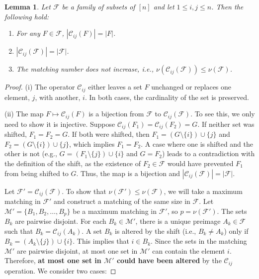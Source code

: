 \documentclass[runningheads,12pt,a4paper]{article}
\newtheorem{lemma}{Lemma}
\begin{document}
\begin{lemma}
	Let $\mathcal{F}$ be a family of subsets of $[n]$ and let $1 \leq i, j \leq n$. Then the following hold:
	\begin{enumerate}[label=(\roman*)]
		\item For any $F \in \mathcal{F}$, $|\mathcal{C}_{ij}(F)| = |F|$.
		\item $|\mathcal{C}_{ij}(\mathcal{F})| = |\mathcal{F}|$.
		\item The matching number does not increase, i.e., $\nu(\mathcal{C}_{ij}(\mathcal{F})) \leq \nu(\mathcal{F})$.
	\end{enumerate}
\end{lemma}
\begin{proof}
	(i) The operator $\mathcal{C}_{ij}$ either leaves a set $F$ unchanged or replaces one element, $j$, with another, $i$. In both cases, the cardinality of the set is preserved.
	
	(ii) The map $F \mapsto \mathcal{C}_{ij}(F)$ is a bijection from $\mathcal{F}$ to $\mathcal{C}_{ij}(\mathcal{F})$. To see this, we only need to show it is injective. Suppose $\mathcal{C}_{ij}(F_1) = \mathcal{C}_{ij}(F_2) = G$. If neither set was shifted, $F_1 = F_2 = G$. If both were shifted, then $F_1 = (G \setminus \{i\}) \cup \{j\}$ and $F_2 = (G \setminus \{i\}) \cup \{j\}$, which implies $F_1 = F_2$. A case where one is shifted and the other is not (e.g., $G = (F_1 \setminus \{j\}) \cup \{i\}$ and $G=F_2$) leads to a contradiction with the definition of the shift, as the existence of $F_2 \in \mathcal{F}$ would have prevented $F_1$ from being shifted to $G$. Thus, the map is a bijection and $|\mathcal{C}_{ij}(\mathcal{F})| = |\mathcal{F}|$.
	
	Let $\mathcal{F}' = \mathcal{C}_{ij}(\mathcal{F})$. To show that $\nu(\mathcal{F}') \leq \nu(\mathcal{F})$, we will take a maximum matching in $\mathcal{F}'$ and construct a matching of the same size in $\mathcal{F}$.
	Let $\mathcal{M}' = \{B_1, B_2, \dots, B_p\}$ be a maximum matching in $\mathcal{F}'$, so $p = \nu(\mathcal{F}')$. The sets $B_k$ are pairwise disjoint. For each $B_k \in \mathcal{M}'$, there is a unique preimage $A_k \in \mathcal{F}$ such that $B_k = \mathcal{C}_{ij}(A_k)$.	
	A set $B_k$ is altered by the shift (i.e., $B_k \neq A_k$) only if $B_k = (A_k \setminus \{j\}) \cup \{i\}$. This implies that $i \in B_k$. Since the sets in the matching $\mathcal{M}'$ are pairwise disjoint, at most one set in $\mathcal{M}'$ can contain the element $i$. Therefore, \textbf{at most one set in $\mathcal{M}'$ could have been altered} by the $\mathcal{C}_{ij}$ operation.	
	We consider two cases:
	

\end{proof}
\end{document}
